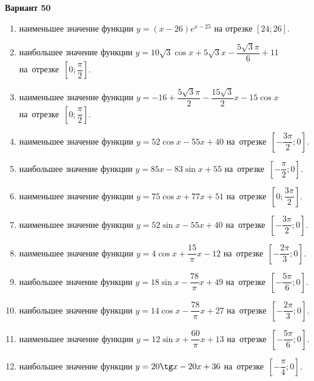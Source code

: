 \documentclass[a4paper,10pt]{article}
\begin{document}
\begin{center}\Large\textbf{Вариант 50}\end{center}

\begin{enumerate}
\item {} наименьшее значение функции $y = \left(x-26\right)e^{x-25}$ на отрезке $\left[24;26\right]$.

\item {} наибольшее значение функции $y = 10\sqrt{3}\cos x+5\sqrt{3}x-\dfrac{5\sqrt{3}\pi}{6} +11$ на~отрезке~$\left[0;\dfrac{\pi }{2}\right]$.

\item {} наименьшее значение функции $y = -16+\dfrac{5\sqrt{3} \pi}{2}-\dfrac{15\sqrt{3}}{2}x-15\cos x$ на~отрезке~$\left[0;\dfrac{\pi }{2}\right]$.

\item {} наименьшее значение функции $y = 52\cos x-55x+40$ на~отрезке~$\left[-\dfrac{3\pi }{2};0\right]$.

\item {} наибольшее значение функции $y = 85x-83\sin x+55$ на~отрезке~$\left[-\dfrac{\pi }{2};0\right]$.

\item {} наименьшее значение функции $y = 75\cos x+77x+51$ на~отрезке~$\left[0;\dfrac{3\pi }{2}\right]$.

\item {} наименьшее значение функции $y = 52\sin x-55x+40$ на~отрезке~$\left[-\dfrac{3\pi }{2};0\right]$.

\item {} наименьшее значение функции $y = 4\cos x+\dfrac{15}{\pi }x -12$ на~отрезке~$\left[-\dfrac{2\pi }{3};0\right]$.

\item {} наибольшее значение функции $y = 18\sin x-\dfrac{78}{\pi }x+49$ на~отрезке~$\left[-\dfrac{5\pi }{6};0\right]$.

\item {} наибольшее значение функции $y = 14\cos x-\dfrac{78}{\pi }x+27$ на~отрезке~$\left[-\dfrac{2\pi }{3};0\right]$.

\item {} наименьшее значение функции $y = 12\sin x+\dfrac{60}{\pi }x+13$ на~отрезке~$\left[-\dfrac{5\pi }{6};0\right]$.

\item {} наибольшее значение функции $y = 20\tg x-20x+36$ на~отрезке~$\left[-\dfrac{\pi }{4};0\right]$.


\end{enumerate}
\end{document}
